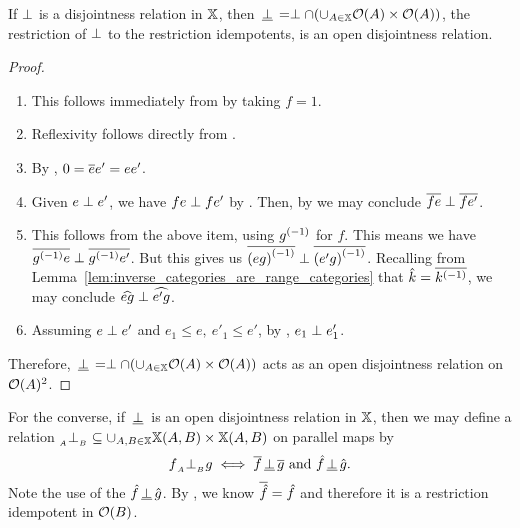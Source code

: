 \begin{proposition}\label{prop:disjointness_is_open_disjointness}
  If $\perp$ is a disjointness relation in $\mathbb{X}$, then $\,\underline{\perp}\, = \perp \cap
  (\cup_{A\in\mathbb{X}} \mathcal{O}({A})\times \mathcal{O}({A}))$, the restriction of $\perp$ to the restriction
  idempotents, is an open disjointness relation.
\end{proposition}
\begin{proof}
  \prepprooflist
  \begin{enumerate}
    \item[\axiom{$\mathcal{O}$dis}{1}] This follows immediately from  by taking
      $f = 1$.
    \item[\axiom{$\mathcal{O}$dis}{2}] Reflexivity follows directly from  .
    \item[\axiom{$\mathcal{O}$dis}{3}] By , $0 = \overline{e} e' = e e'$.
    \item[\axiom{$\mathcal{O}$dis}{4}] Given $e \perp e'$, we have $f e \perp f e'$ by
      . Then, by  we may conclude $\overline{f e} \perp \overline{f e'}$.
    \item[\axiom{$\mathcal{O}$dis}{5}] This follows from the above item, using ${g}^{(-1)}$ for $f$.
      This means we have $\overline{{g}^{(-1)}e} \perp \overline{{g}^{(-1)}e'}$. But this gives us $\overline{{(e
      g)}^{(-1)}} \perp \overline{{(e' g)}^{(-1)}}$. Recalling from
      Lemma~\ref{lem:inverse_categories_are_range_categories} that $\hat{k} = \overline{{k}^{(-1)}}$, we may
      conclude $\widehat{e g} \perp \widehat{e' g}$.
    \item[\axiom{$\mathcal{O}$dis}{6}] Assuming $e \perp e'$ and $e_1 \le e,\ e'_1 \le e'$, by
      , $e_1 \perp e'_1$.
  \end{enumerate}
  Therefore, $\,\underline{\perp}\, = \perp \cap (\cup_{A\in\mathbb{X}} \mathcal{O}({A})\times \mathcal{O}({A}))$ acts as an
  open disjointness relation on $\mathcal{O}({A})^2$.

\end{proof}

For the converse, if $\,\underline{\perp}\,$ is an open disjointness relation in $\mathbb{X}$, then we may define a relation
${}_{{}_{A}}{\perp_{{}_{B}}} \subseteq \cup_{A,B\in\mathbb{X}} \mathbb{X}(A,B)\times \mathbb{X}(A,B)$ on parallel maps by
\[
  f{}_{{}_{A}}{\perp_{{}_{B}}} g \iff  \overline{f}\,\underline{\perp}\,\overline{g} \text{ and } \hat{f}\,\underline{\perp}\,\hat{g}.
\]
Note the use of the $\hat{f}\,\underline{\perp}\,\hat{g}$. By \rrone, we know $\overline{\hat{f}} = \hat{f}$ and
therefore it is a restriction idempotent in $\mathcal{O}({B})$.


